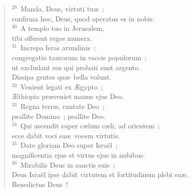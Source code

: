 \begin{verse}
${}^{29}$~Manda, Deus, virtuti tu\ae~;\\ confirma hoc, Deus, quod operatus es in nobis.\\
${}^{30}$~A templo tuo in Jerusalem,\\ tibi offerent reges munera.\\
${}^{31}$~Increpa feras arundinis~;\\ congregatio taurorum in vaccis populorum~:\\ ut excludant eos qui probati sunt argento.\\ Dissipa gentes qu\ae\ bella volunt.\\
${}^{32}$~Venient legati ex \AE gypto~;\\ \AE thiopia pr\ae veniet manus ejus Deo.\\
${}^{33}$~Regna terr\ae , cantate Deo~;\\ psallite Domino~; psallite Deo.\\
${}^{34}$~Qui ascendit super c\ae lum c\ae li, ad orientem~:\\ ecce dabit voci su\ae\ vocem virtutis.\\
${}^{35}$~Date gloriam Deo super Isra\"el~;\\ magnificentia ejus et virtus ejus in nubibus.\\
${}^{36}$~Mirabilis Deus in sanctis suis~;\\ Deus Isra\"el ipse dabit virtutem et fortitudinem plebi su\ae .\\ Benedictus Deus~!\end{verse}



